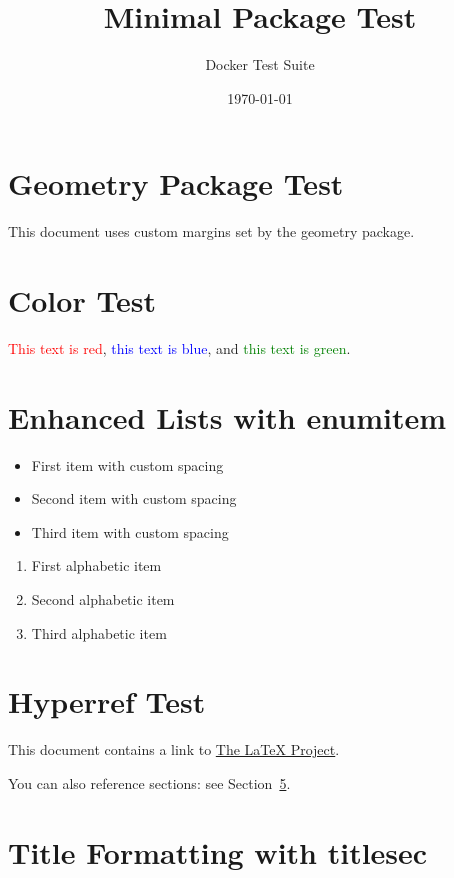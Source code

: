 \documentclass{article}
\title{Minimal Package Test}
\author{Docker Test Suite}
\date{\today}
\begin{document}
\maketitle

\section{Geometry Package Test}
This document uses custom margins set by the geometry package.

\section{Color Test}
\textcolor{red}{This text is red}, \textcolor{blue}{this text is blue}, and \textcolor{green}{this text is green}.

\section{Enhanced Lists with enumitem}
\begin{itemize}[label=\textbullet, itemsep=0.5em]
    \item First item with custom spacing
    \item Second item with custom spacing
    \item Third item with custom spacing
\end{itemize}

\begin{enumerate}[label=(\alph*), start=1]
    \item First alphabetic item
    \item Second alphabetic item
    \item Third alphabetic item
\end{enumerate}

\section{Hyperref Test}
This document contains a link to \href{https://www.latex-project.org/}{The LaTeX Project}.

You can also reference sections: see Section~\ref{sec:titlesec}.

\section{Title Formatting with titlesec}
\label{sec:titlesec}

\titlesec{\subsection}{\normalfont\large\bfseries\color{blue}}{\thesubsection}{1em}{}
\end{document}
